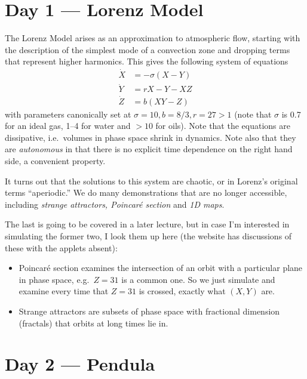 \documentclass[10pt]{article}
\begin{document}
\pagestyle{fancy}
\cfoot{\thepage/\pageref{LastPage}}

\tableofcontents
\clearpage

\section{Day 1 --- Lorenz Model}

The Lorenz Model arises as an approximation to atmospheric flow, starting with
the description of the simplest mode of a convection zone and dropping terms
that represent higher harmonics. This gives the following system of equations
\begin{align}
    \dot{X} &= -\sigma(X - Y) \nonumber\\
    \dot{Y} &= rX - Y - XZ \nonumber\\
    \dot{Z} &= b(XY - Z)
\end{align}
with parameters canonically set at $\sigma = 10, b = 8/3, r =27 > 1$ (note that
$\sigma$ is 0.7 for an ideal gas, 1--4 for water and $>10$ for oils). Note that
the equations are dissipative, i.e.\ volumes in phase space shrink in dynamics.
Note also that they are \emph{autonomous} in that there is no explicit time
dependence on the right hand side, a convenient property.

It turns out that the solutions to this system are chaotic, or in Lorenz's
original terms ``aperiodic.'' We do many demonstrations that are no longer
accessible, including \emph{strange attractors, Poincar\'e section} and
\emph{1D maps}.

The last is going to be covered in a later lecture, but in case I'm interested
in simulating the former two, I look them up here (the website has discussions
of these with the applets absent):
\begin{itemize}
    \item Poincar\'e section examines the intersection of an orbit with a
        particular plane in phase space, e.g.\ $Z=31$ is a common one. So we
        just simulate and examine every time that $Z=31$ is crossed, exactly
        what $(X,Y)$ are.
    \item Strange attractors are subsets of phase space with fractional
        dimension (fractals) that orbits at long times lie in.
\end{itemize}

\section{Day 2 --- Pendula}
\end{document}
